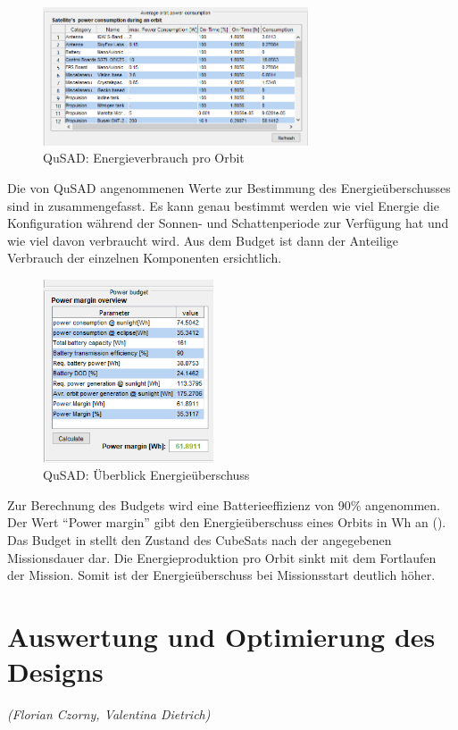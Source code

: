 			\begin{figure}[H]
				\centering
					\includegraphics[width=0.70\textwidth]{graphics/power5.png}
				\caption{QuSAD: Energieverbrauch pro Orbit}
				\label{fig:power5}
			\end{figure}
Die von QuSAD angenommenen Werte zur Bestimmung des Energieüberschusses sind in   zusammengefasst. Es kann genau bestimmt werden wie viel Energie die Konfiguration während der Sonnen- und Schattenperiode zur Verfügung hat und wie viel davon verbraucht wird. Aus dem Budget ist dann der Anteilige Verbrauch der 
einzelnen Komponenten ersichtlich.

			
			\begin{figure}[H]
				\centering
					\includegraphics[width=0.45\textwidth]{graphics/power6.png}
				\caption{QuSAD: Überblick Energieüberschuss}
				\label{fig:power6}
			\end{figure}
Zur Berechnung des Budgets wird eine Batterieeffizienz von \num{90}\% angenommen. Der Wert “Power margin” gibt den Energieüberschuss eines Orbits in Wh an (). Das Budget in  stellt den Zustand des CubeSats nach der angegebenen Missionsdauer dar. Die Energieproduktion pro Orbit sinkt mit dem Fortlaufen der  Mission. Somit ist der Energieüberschuss bei Missionsstart deutlich höher. 			
			
			
			
			\section{Auswertung und Optimierung des Designs}
			\hfill\emph{(Florian Czorny, Valentina Dietrich)}
			
